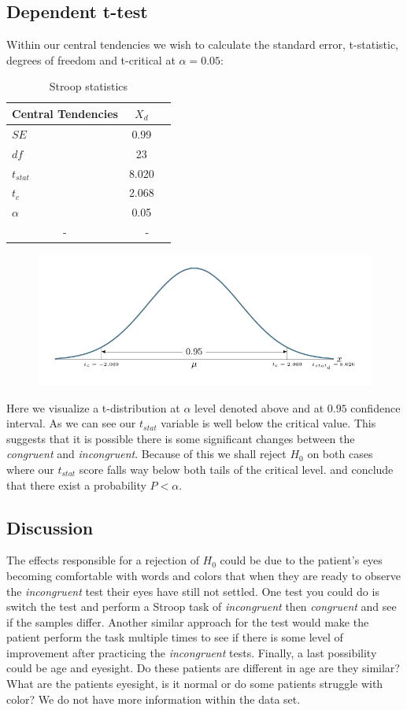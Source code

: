 \documentclass[8pt]{article}
\newcommand{\8}{\bar}
\begin{document}
\subsection{Dependent t-test} 
Within our central tendencies we wish to calculate the standard error, t-statistic, degrees of freedom and t-critical at $\alpha = 0.05$: 
\begin{table}[htbp]\centering \caption{Stroop statistics \label{sumstat}}
\begin{tabular}{l c c  }\hline\hline
\multicolumn{1}{c}{\textbf{Central Tendencies}}  & $X_{d}$ \\ \hline
$SE$ & 0.99\\
$df$ & 23\\
$t_{stat}$ &  8.020 \\ 
$t_{c}$ &  2.068\\ 
$\alpha$ & 0.05\\
\multicolumn{1}{c}{-} & \multicolumn{2}{c}{-}\\ \hline
\end{tabular}
\end{table}
\begin{figure}[H]
\includegraphics[page=1,scale=0.8]{t_stat_d.pdf} 
\end{figure} 
Here we visualize a t-distribution at $\alpha$ level denoted above and at $0.95$ confidence interval. As we can see our $t_{stat}$ variable is well below the critical value. This suggests that it is possible there is some significant changes between the \textit{congruent} and \textit{incongruent}. Because of this we shall reject $H_{0}$ on both cases where our $t_{stat}$ score falls way below both tails of the critical level. and conclude that there exist a probability $P < \alpha$.
\subsection{Discussion}
The effects responsible for a rejection of $H_{0}$ could be due to the patient's eyes becoming comfortable with words and colors that when they are ready to observe the \textit{incongruent} test their eyes have still not settled. One test you could do is switch the test and perform a Stroop task of \textit{incongruent} then \textit{congruent} and see if the samples differ. Another similar approach for the test would make the patient perform the task multiple times to see if there is some level of improvement after practicing the \textit{incongruent} tests. Finally, a last possibility could be age and eyesight. Do these patients are different in age are they similar? What are the patients eyesight, is it normal or do some patients struggle with color? We do not have more information within the data set.
\end{document}
